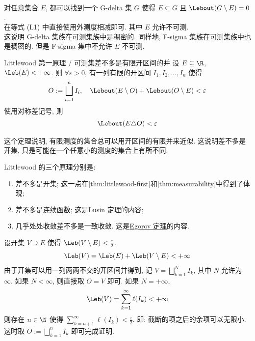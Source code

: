 \begin{rmk}
    对任意集合 \(E\), 都可以找到一个 G-delta 集 \(G\) 使得 \(E\subseteq G\) 且 \(\Lebout(G\setminus E)=0\). \\
    在等式 (L1) 中直接使用外测度相减即可. 其中 \(E\) 允许不可测.\\
    这说明 G-delta 集族在可测集族中是稠密的. 同样地, F-sigma 集族在可测集族中也是稠密的. 但是 F-sigma 集中不允许 \(E\) 不可测.
\end{rmk}
\begin{thm}
    {Littlewood 第一原理 / 可测集差不多是有限开区间的并}
    设 \(E\subseteq\R\), \(\Leb(E)<+\infty\). 则 \(\forall\varepsilon>0\), 有一列有限的开区间 \(I_1, I_2, \ldots, I_n\) 使得 
    \[O:=\bigsqcup_{i=1}^n I_i, \quad \Lebout(E\setminus O)+\Lebout(O\setminus E)<\varepsilon\]
    使用对称差记号, 则
    \[\Lebout(E\triangle O)<\varepsilon\]
\end{thm}
\begin{rmk}
    这个定理说明, 有限测度的集合总可以用开区间的有限并来近似. 这说明\MeasurableSet{}差不多是开集, 只是可能在一个任意小的测度的集合上有所不同. 
\end{rmk}
\begin{rmk}
    Littlewood 的三个原理分别是:
    \begin{enumerate}
        \item \MeasurableSet{}差不多是开集; 这一点在\ref{thm:littlewood-first}和\ref{thm:measurability}中得到了体现;
        \item \MeasurableFunc{}差不多是连续函数; 这是\hyperref[thm:lusin]{Lusin 定理}的内容;
        \item 几乎处处收敛差不多是一致收敛. 这是\hyperref[thm:egorov]{Egorov 定理}的内容.
    \end{enumerate}
\end{rmk}
\begin{prf}
    设开集 \(V\supseteq E\) 使得 \(\Leb(V\setminus E)<\frac{\varepsilon}{2}\). 
    \[\Leb(V)=\Leb(E)+\Leb(V\setminus E)<+\infty\]
    由于开集可以用一列两两不交的开区间并得到, 记 \(V=\bigsqcup_{k=1}^N I_k\), 其中 \(N\) 允许为 \(\infty\). 如果 \(N<\infty\), 则直接取 \(O=V\) 即可. 
    如果 \(N=+\infty\), 
    \[\Leb(V)=\sum_{k=1}^\infty \ell(I_k)<+\infty\]
    则存在 \(n\in\N\) 使得 \(\sum_{k=n+1}^\infty \ell(I_k)<\frac{\varepsilon}{2}\). 即: 截断的项之后的余项可以无限小. 这时取 \(O:=\bigsqcup_{k=1}^n I_k\) 即可完成证明.
\end{prf}
